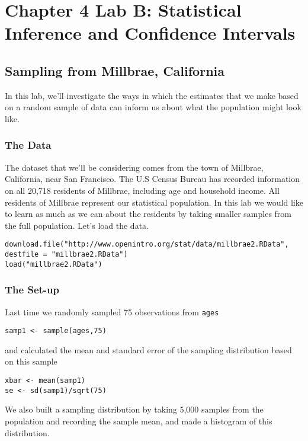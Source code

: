 \documentclass[11pt]{article}
\begin{document}
\section*{Chapter 4 Lab B: Statistical Inference and Confidence Intervals}
\subsection*{Sampling from Millbrae, California}

In this lab, we'll investigate the ways in which the estimates that we make based on a random sample of data can inform us about what the population might look like. 

\subsubsection*{The Data}
The dataset that we'll be considering comes from the town of Millbrae, California, near San Francisco.  The U.S Census Bureau has recorded information on all 20,718 residents of Millbrae, including age and household income.  All residents of Millbrae represent our statistical population.  In this lab we would like to learn as much as we can about the residents by taking smaller samples from the full population.  Let's load the data.

\begin{lstlisting}
download.file("http://www.openintro.org/stat/data/millbrae2.RData", destfile = "millbrae2.RData")
load("millbrae2.RData")
\end{lstlisting}

\subsubsection*{The Set-up}
Last time we randomly sampled 75 observations from \texttt{ages}

\begin{lstlisting}
samp1 <- sample(ages,75)
\end{lstlisting}

and calculated the mean and standard error of the sampling distribution based on this sample

\begin{lstlisting}
xbar <- mean(samp1)
se <- sd(samp1)/sqrt(75)
\end{lstlisting}

We also built a sampling distribution by taking 5,000 samples from the population and recording the sample mean, and made a histogram of this distribution.
\end{document}
